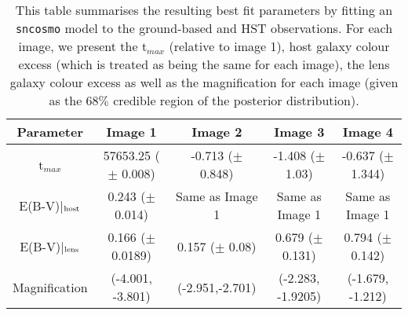 \begin{table*}
\centering
\caption{This table summarises the resulting best fit parameters by fitting an \texttt{sncosmo} model to the ground-based and HST observations. For each image, we present the t$_{max}$ (relative to image 1), host galaxy colour excess (which is treated as being the same for each image), the lens galaxy colour excess as well as the magnification for each image (given as the 68$\%$ credible region of the posterior distribution).}
\begin{tabular}{|c|c|c|c|c|}
\hline
Parameter & Image 1 & Image 2 &  Image 3 & Image 4 \\
\hline\hline
t$_{max}$ &  57653.25 ($\pm$ 0.008) & -0.713 ($\pm$  0.848) & -1.408  ($\pm$ 1.03) & -0.637 ($\pm$ 1.344) \\
E(B-V)|$_{\rm host}$ & 0.243 ($\pm$ 0.014) & Same as Image 1 & Same as Image 1 & Same as Image 1  \\
E(B-V)|$_{\rm lens}$ &  0.166 ($\pm$ 0.0189) &  0.157 ($\pm$ 0.08) & 0.679 ($\pm$ 0.131) & 0.794 ($\pm$ 0.142) \\
Magnification & (-4.001, -3.801) & (-2.951,-2.701)  &  (-2.283, -1.9205) & (-1.679, -1.212)
\\

\hline
\end{tabular}
\label{tab:params}
\end{table*}